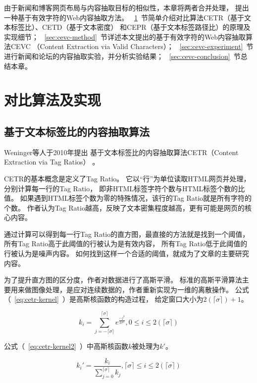 由于新闻和博客网页布局与内容抽取目标的相似性，本章将两者合并处理，
提出一种基于有效字符的Web内容抽取方法。
~\ref{sec:cevc-other}~节简单介绍对比算法CETR（基于文本标签比）、CETD（基于文本密度）
和CEPR（基于文本标签路径比）的原理及实现细节；
~\ref{sec:cevc-method}~节详述本文提出的基于有效字符的Web内容抽取算法CEVC
（Content Extraction via Valid Characters）；
~\ref{sec:cevc-experiment}~节进行新闻和论坛的内容抽取实验，并分析实验结果；
~\ref{sec:cevc-conclusion}~节总结本章。

\section{对比算法及实现}
\label{sec:cevc-other}

\subsection{基于文本标签比的内容抽取算法}
Weninger等人于2010年提出
基于文本标签比的内容抽取算法CETR（Content Extraction via Tag Ratios）
。

CETR的基本概念是定义了Tag Ratio。
它以“行”为单位读取HTML网页并处理，分别计算每一行的Tag Ratio，
即非HTML标签字符个数与HTML标签个数的比值。
如果遇到HTML标签个数为零的特殊情况，该行的Tag Ratio就是所有字符的个数。
作者认为Tag Ratio越高，反映了文本密集程度越高，更有可能是网页的核心内容。

通过计算可以得到每一行Tag Ratio的直方图，最直接的方法就是找到一个阈值，
所有Tag Ratio高于此阈值的行被认为是有效内容，
所有Tag Ratio低于此阈值的行被认为是噪声内容。
如何找到这样一个合适的阈值，就成为了文章的主要研究内容。

为了提升直方图的区分度，作者对数据进行了高斯平滑。
标准的高斯平滑算法主要用来做图像处理，是应对连续数据的，作者重新实现为一维的离散操作。
公式（~\ref{eq:cetr-kernel}~）是高斯核函数的构造过程，
给定窗口大小为$2(\lceil \sigma \rceil) + 1$。

\begin{equation}
\label{eq:cetr-kernel}
k_i = \sum_{j=-\lceil \sigma \rceil}^{\lceil \sigma \rceil}
e^{\frac{-j^2}{2\sigma^2}}, 0 \leq i \leq 2(\lceil \sigma \rceil)
\end{equation}

公式（~\ref{eq:cetr-kernel2}~）中高斯核函数$k$被处理为$k'$。

\begin{equation}
\label{eq:cetr-kernel2}
k_i' = \frac{k_i}{\sum_{j=0}^{\lceil \sigma \rceil}k_j},
\lceil \sigma \rceil \leq i \leq 2(\lceil \sigma \rceil)
\end{equation}

